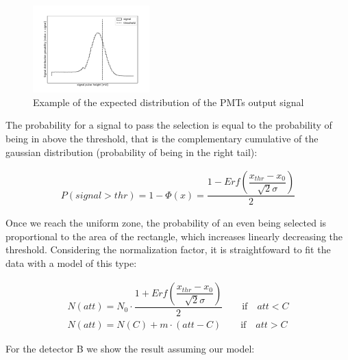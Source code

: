 \begin{figure}[hbtp]
\centering
\includegraphics[width = 0.40\textwidth]{Analysis/distribution.pdf}
\caption{Example of the expected distribution of the PMTs output signal}
\label{fig:PDF}
\end{figure}

The probability for a signal to pass the selection is equal to the probability of being in above the threshold, that is the complementary cumulative of the gaussian distribution (probability of being in the right tail):

\begin{align*}
P(signal > thr) = 1 - \Phi(x) = \dfrac{1 - Erf(\dfrac{x_{thr} - x_{0}}{\sqrt{2} \sigma })}{2}
\end{align*}

Once we reach the uniform zone, the probability of an even being selected is proportional to the area of the rectangle, which increases linearly decreasing the threshold. Considering the normalization factor, it is straightfoward to fit the data with a model of this type:

\begin{equation}
\begin{split}
N(att) = N_{0} \cdot \dfrac{1 + Erf(\dfrac{x_{thr} - x_{0}}{\sqrt{2} \sigma })}{2} \qquad \text{if} \quad att < C  \\
N(att) = N(C) + m \cdot (att - C) \qquad \text{if} \quad att > C
\end{split}
\end{equation}

For the detector B we show the result assuming our model: 

